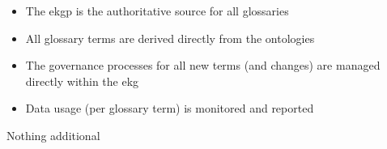 \kgmmscoringlevelFour

\begin{itemize}
  \item The \acrlong{ekgp} is the authoritative source for all glossaries
  \item All glossary terms are derived directly from the ontologies
  \item The governance processes for all new terms (and changes) are managed directly within the \acrshort{ekg}
  \item Data usage (per glossary term) is monitored and reported
\end{itemize}

\kgmmscoringlevelFive

Nothing additional

